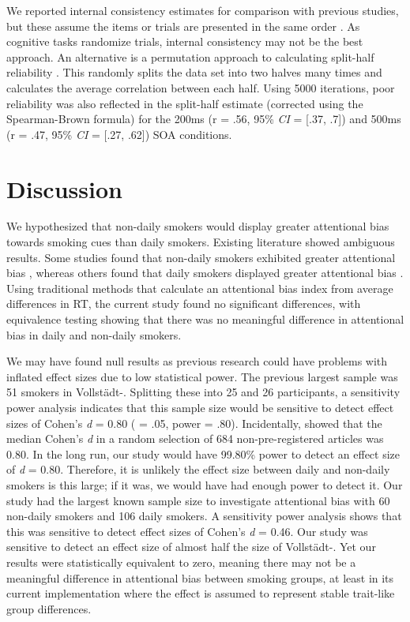 \documentclass[empirical, authordate]{jote-new-article}
\begin{document}
We reported internal consistency estimates for comparison with previous studies, but these assume the items or trials are presented in the same order \parencite{Parsons2019}. As cognitive tasks randomize trials, internal consistency may not be the best approach. An alternative is a permutation approach to calculating split-half reliability \parencite{Parsons2020}. This randomly splits the data set into two halves many times and calculates the average correlation between each half. Using 5000 iterations, poor reliability was also reflected in the split-half estimate (corrected using the Spearman-Brown formula) for the 200ms (r = .56, 95\% \emph{CI} = [.37, .7]) and 500ms (r = .47, 95\% \emph{CI} = [.27, .62]) SOA conditions.

\section{Discussion}

We hypothesized that non-daily smokers would display greater attentional bias towards smoking cues than daily smokers. Existing literature showed ambiguous results. Some studies found that non-daily smokers exhibited greater attentional bias \parencite{Bradley2003, Hogarth2003, Mogg2005}, whereas others found that daily smokers displayed greater attentional bias \parencite{Chanon2010, Vollstädt-Klein2011, Zack2001}. Using traditional methods that calculate an attentional bias index from average differences in RT, the current study found no significant differences, with equivalence testing showing that there was no meaningful difference in attentional bias in daily and non-daily smokers.

We may have found null results as previous research could have problems with inflated effect sizes due to low statistical power. The previous largest sample was 51 smokers in Vollstädt-\parencite{Vollstädt-Klein2011}. Splitting these into 25 and 26 participants, a sensitivity power analysis indicates that this sample size would be sensitive to detect effect sizes of Cohen's \emph{d} = 0.80 (\emph{} = .05, power = .80). Incidentally, \textcite{Schaefer2019} showed that the median Cohen's \emph{d} in a random selection of 684 non-pre-registered articles was 0.80. In the long run, our study would have 99.80\% power to detect an effect size of \emph{d} = 0.80. Therefore, it is unlikely the effect size between daily and non-daily smokers is this large; if it was, we would have had enough power to detect it. Our study had the largest known sample size to investigate attentional bias with 60 non-daily smokers and 106 daily smokers. A sensitivity power analysis shows that this was sensitive to detect effect sizes of Cohen's \emph{d} = 0.46. Our study was sensitive to detect an effect size of almost half the size of Vollstädt-\parencite{Vollstädt-Klein2011}. Yet our results were statistically equivalent to zero, meaning there may not be a meaningful difference in attentional bias between smoking groups, at least in its current implementation where the effect is assumed to represent stable trait-like group differences.
\end{document}
